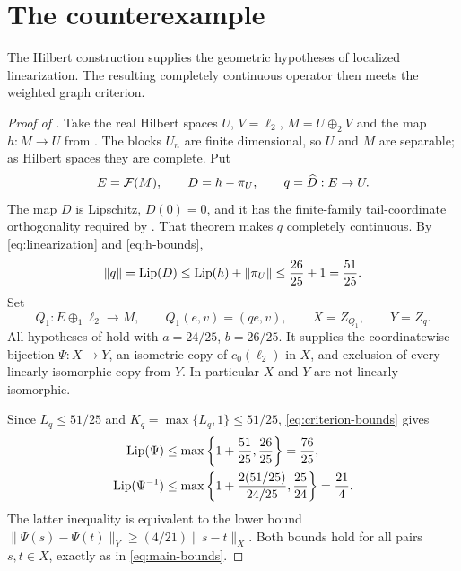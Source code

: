 \section{The counterexample}
\label{sec:assembly}

The Hilbert construction supplies the geometric hypotheses of localized
linearization. The resulting completely continuous operator then meets
the weighted graph criterion.

\begin{proof}[Proof of ]
Take the real Hilbert spaces \(U\), \(V=\ell_2\), \(M=U\oplus_2V\)
and the map \(h:M\to U\) from . The blocks
\(U_n\) are finite dimensional, so \(U\) and \(M\) are separable;
as Hilbert spaces they are complete. Put
\[
 E=\mathcal F(M),\qquad D=h-\pi_U,\qquad q=\widehat D:E\to U.
\]
The map \(D\) is Lipschitz, \(D(0)=0\), and it has the finite-family
tail-coordinate orthogonality required by
. That theorem makes \(q\)
completely continuous. By \eqref{eq:linearization} and
\eqref{eq:h-bounds},
\[
 \|q\|=\operatorname{Lip}(D)\le\operatorname{Lip}(h)+\|\pi_U\|
 \le\frac{26}{25}+1=\frac{51}{25}.
\]
Set
\[
 Q_1:E\oplus_1\ell_2\to M,\qquad Q_1(e,v)=(qe,v),\qquad
 X=Z_{Q_1},\qquad Y=Z_q.
\]
All hypotheses of  hold with
\(a=24/25\), \(b=26/25\). It supplies the coordinatewise bijection
\(\Psi:X\to Y\), an isometric copy of \(c_0(\ell_2)\) in \(X\),
and exclusion of every linearly isomorphic copy from \(Y\).
In particular \(X\) and \(Y\) are not linearly isomorphic.

Since \(L_q\le51/25\) and \(K_q=\max\{L_q,1\}\le51/25\),
\eqref{eq:criterion-bounds} gives
\[
\begin{aligned}
 \operatorname{Lip}(\Psi)&\le
 \max\left\{1+\frac{51}{25},\frac{26}{25}\right\}
 =\frac{76}{25},\\
 \operatorname{Lip}(\Psi^{-1})&\le
 \max\left\{1+\frac{2(51/25)}{24/25},\frac{25}{24}\right\}
 =\frac{21}{4}.
\end{aligned}
\]
The latter inequality is equivalent to the lower bound
\(\|\Psi(s)-\Psi(t)\|_Y\ge(4/21)\|s-t\|_X\).
Both bounds hold for all pairs \(s,t\in X\), exactly as in
\eqref{eq:main-bounds}.
\end{proof}
